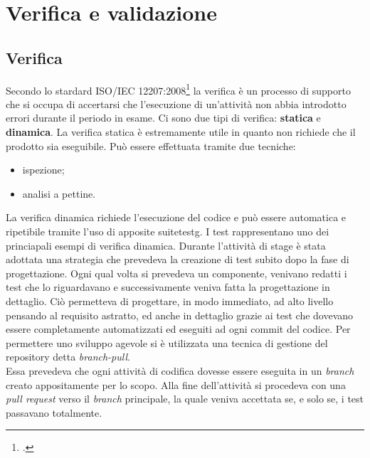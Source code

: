 
\chapter{Verifica e validazione}
\label{cap:verifica-validazione}
\section{Verifica}
Secondo lo stardard ISO/IEC 12207:2008\footcite{ISO:Systems-and-software-engineering} la verifica è un processo di supporto che si occupa di accertarsi che l’esecuzione di un'attività non abbia introdotto errori durante il periodo in esame. 
Ci sono due tipi di verifica: \textbf{statica} e \textbf{dinamica}.
La verifica statica è estremamente utile in quanto non richiede che il prodotto sia eseguibile. Può essere effettuata tramite due tecniche:
\begin{itemize}
    \item ispezione;
    \item analisi a pettine.
\end{itemize}
La verifica dinamica richiede l'esecuzione del codice e può essere automatica e ripetibile tramite l'uso di apposite \gls{suitetestg}\glsfirstoccur. I test rappresentano uno dei princiapali esempi di verifica dinamica. Durante l'attività di stage è stata adottata una strategia che prevedeva la creazione di test subito dopo la fase di progettazione. Ogni qual volta si prevedeva un componente, venivano redatti i test che lo riguardavano e successivamente veniva fatta la progettazione in dettaglio. Ciò permetteva di progettare, in modo immediato, ad alto livello pensando al requisito astratto, ed anche in dettaglio grazie ai test che dovevano essere completamente automatizzati ed eseguiti ad ogni commit del codice. 
Per permettere uno sviluppo agevole si è utilizzata una tecnica di gestione del repository detta \emph{branch-pull}.\\
Essa prevedeva che ogni attività di codifica dovesse essere eseguita in un \emph{branch} creato appositamente per lo scopo. Alla fine dell'attività si procedeva con una \emph{pull request} verso il \emph{branch} principale, la quale veniva accettata se, e solo se, i test passavano totalmente. \\

